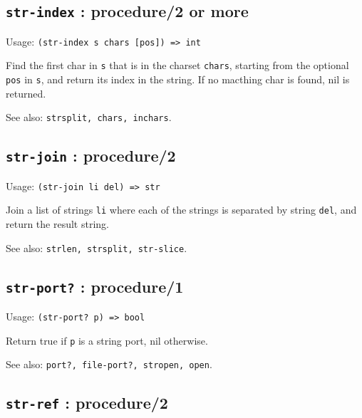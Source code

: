 \documentclass[
]{article}
\newcommand{\passthrough}[1]{#1}
\begin{document}
\hypertarget{str-index-procedure2-or-more-1}{%
\subsection{\texorpdfstring{\texttt{str-index} : procedure/2 or
more}{str-index : procedure/2 or more}}\label{str-index-procedure2-or-more-1}}

Usage: \passthrough{\lstinline!(str-index s chars [pos]) => int!}

Find the first char in \passthrough{\lstinline!s!} that is in the
charset \passthrough{\lstinline!chars!}, starting from the optional
\passthrough{\lstinline!pos!} in \passthrough{\lstinline!s!}, and return
its index in the string. If no macthing char is found, nil is returned.

See also: \passthrough{\lstinline!strsplit, chars, inchars!}.

\hypertarget{str-join-procedure2-1}{%
\subsection{\texorpdfstring{\texttt{str-join} :
procedure/2}{str-join : procedure/2}}\label{str-join-procedure2-1}}

Usage: \passthrough{\lstinline!(str-join li del) => str!}

Join a list of strings \passthrough{\lstinline!li!} where each of the
strings is separated by string \passthrough{\lstinline!del!}, and return
the result string.

See also: \passthrough{\lstinline!strlen, strsplit, str-slice!}.

\hypertarget{str-port-procedure1-1}{%
\subsection{\texorpdfstring{\texttt{str-port?} :
procedure/1}{str-port? : procedure/1}}\label{str-port-procedure1-1}}

Usage: \passthrough{\lstinline!(str-port? p) => bool!}

Return true if \passthrough{\lstinline!p!} is a string port, nil
otherwise.

See also: \passthrough{\lstinline!port?, file-port?, stropen, open!}.

\hypertarget{str-ref-procedure2-1}{%
\subsection{\texorpdfstring{\texttt{str-ref} :
procedure/2}{str-ref : procedure/2}}\label{str-ref-procedure2-1}}
\end{document}

